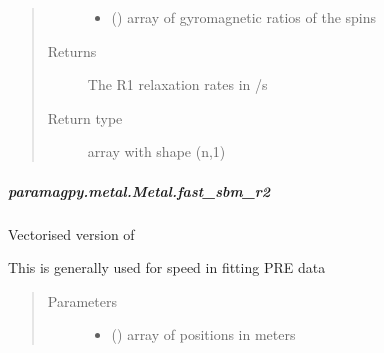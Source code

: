 \documentclass[a4paper,10pt,english]{sphinxmanual}
\begin{document}
\begin{fulllineitems}
\begin{fulllineitems}
\begin{fulllineitems}
\begin{quote}
\begin{description}
\begin{itemize}
\item {} 
 (\sphinxstyleliteralemphasis{\sphinxupquote{ (}}\sphinxstyleliteralemphasis{\sphinxupquote{,}}\sphinxstyleliteralemphasis{\sphinxupquote{)}}) \textendash{} array of gyromagnetic ratios of the spins

\end{itemize}

\item[{Returns}] \leavevmode
{} \textendash{} The R1 relaxation rates in /s

\item[{Return type}] \leavevmode
array with shape (n,1)

\end{description}\end{quote}

\end{fulllineitems}



\subparagraph{paramagpy.metal.Metal.fast\_sbm\_r2}
\label{\detokenize{reference/generated/paramagpy.metal.Metal.fast_sbm_r2:paramagpy-metal-metal-fast-sbm-r2}}\label{\detokenize{reference/generated/paramagpy.metal.Metal.fast_sbm_r2::doc}}

\begin{fulllineitems}
\label{\detokenize{reference/generated/paramagpy.metal.Metal.fast_sbm_r2:paramagpy.metal.Metal.fast_sbm_r2}}
Vectorised version of {\hyperref[\detokenize{reference/generated/paramagpy.metal.Metal.sbm_r2:paramagpy.metal.Metal.sbm_r2}]{}}

This is generally used for speed in fitting PRE data
\begin{quote}\begin{description}
\item[{Parameters}] \leavevmode\begin{itemize}
\item {} 
 (\sphinxstyleliteralemphasis{\sphinxupquote{ (}}\sphinxstyleliteralemphasis{\sphinxupquote{,}}\sphinxstyleliteralemphasis{\sphinxupquote{)}}) \textendash{} array of positions in meters


\end{itemize}
\end{description}
\end{quote}
\end{fulllineitems}
\end{fulllineitems}
\end{fulllineitems}
\end{document}
